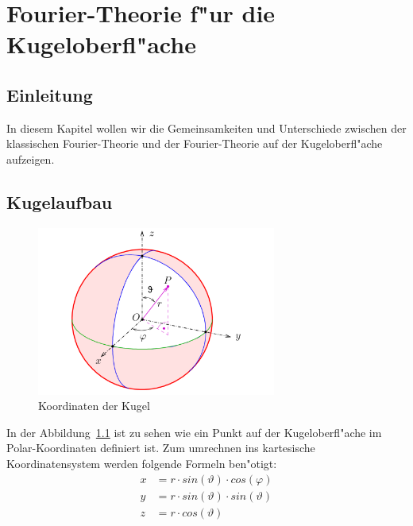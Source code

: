 \chapter{Fourier-Theorie f"ur die Kugeloberfl"ache\label{chapter:kugel}}
\begin{refsection}



\section{Einleitung}

In diesem Kapitel wollen wir die Gemeinsamkeiten und Unterschiede zwischen der klassischen Fourier-Theorie und der Fourier-Theorie auf der Kugeloberfl"ache aufzeigen.
 

\section{Kugelaufbau}

\begin{figure}%
\centering
\includegraphics[width=0.7\textwidth]{kugel/Kugelkoord.pdf}
\caption{Koordinaten der Kugel  \cite{kugel}
\label{skript:Koordinaten der Kugel}}
\end{figure}

In der Abbildung~\ref{skript:Koordinaten der Kugel}   
ist zu sehen wie ein Punkt auf der Kugeloberfl"ache im Polar-Koordinaten definiert ist. Zum umrechnen ins kartesische Koordinatensystem werden folgende Formeln ben"otigt:
\begin{align*}
x& = r \cdot sin(\vartheta) \cdot cos(\varphi) 
\\
y& = r \cdot sin(\vartheta) \cdot sin(\vartheta)
\\
z& = r \cdot cos(\vartheta) 
\end{align*}
 

\end{refsection}
